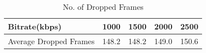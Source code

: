 \begin{table}[htb]
\centering
\caption{No. of Dropped Frames}
\label{tab:bitrate}

\begin{tabular}{|l|l|l|l|l|}
\hline
Bitrate(kbps)          & 1000  & 1500  & 2000  & 2500  \\ \hline
Average Dropped Frames & 148.2 & 148.2 & 149.0 & 150.6 \\ \hline
\end{tabular}
\end{table}
